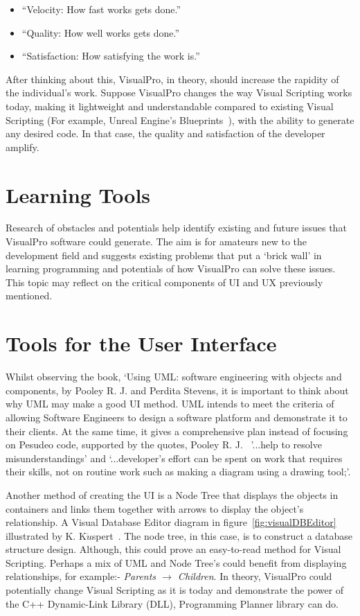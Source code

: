 \documentclass[12pt]{report} %
\begin{document}
		\begin{itemize}
		\item ``Velocity: How fast works gets done.''
		\item ``Quality: How well works gets done.''
		\item ``Satisfaction: How satisfying the work is.''
		\end{itemize}

		After thinking about this, VisualPro, in theory, should increase the rapidity of the individual’s work. Suppose VisualPro changes the way Visual Scripting works today, making it lightweight and understandable compared to existing Visual Scripting (For example, Unreal Engine's Blueprints~\cite{unreal_engine_introduction_nodate}), with the ability to generate any desired code. In that case, the quality and satisfaction of the developer amplify.

	\section{Learning Tools}
		Research of obstacles and potentials help identify existing and future issues that VisualPro software could generate. The aim is for amateurs new to the development field and suggests existing problems that put a `brick wall' in learning programming and potentials of how VisualPro can solve these issues. This topic may reflect on the critical components of UI and UX previously mentioned.

	\section{Tools for the User Interface}  
		Whilst observing the book, `Using UML: software engineering with objects and components, by Pooley R. J. and Perdita Stevens\cite{pooley_r_j_using_2006}, it is important to think about why UML may make a good UI method. UML intends to meet the criteria of allowing Software Engineers to design a software platform and demonstrate it to their clients. At the same time, it gives a comprehensive plan instead of focusing on Pesudeo code, supported by the quotes, Pooley R. J.~\cite{pooley_r_j_using_2006} '...help to resolve misunderstandings' and `...developer's effort can be spent on work that requires their skills, not on routine work such as making a diagram using a drawing tool;'.
		
		Another method of creating the UI is a Node Tree that displays the objects in containers and links them together with arrows to display the object's relationship. A Visual Database Editor diagram in figure~\ref{fig:visualDBEditor} illustrated by K. K${\ddot{u}}$spert~\cite{kuspert_design_1990}. The node tree, in this case, is to construct a database structure design. Although, this could prove an easy-to-read method for Visual Scripting. Perhaps a mix of UML and Node Tree's could benefit from displaying relationships, for example:- \textit{Parents ${\to}$ Children}. In theory, VisualPro could potentially change Visual Scripting as it is today and demonstrate the power of the C++ Dynamic-Link Library (DLL), Programming Planner library can do.
\end{document}
